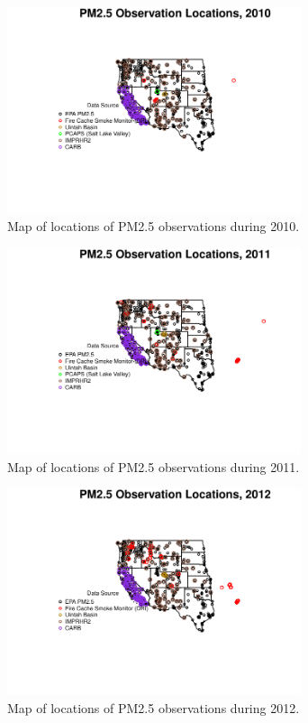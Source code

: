 \begin{figure} 
\centering 
\includegraphics[width=0.77\textwidth]{Code_Outputs/MapPM25_All_Sitesplot_year2010.pdf} 
\caption{\label{fig:MapPM25Loc2010}Map of locations of PM2.5 observations during 2010.} 
\end{figure} 
 

\begin{figure} 
\centering 
\includegraphics[width=0.77\textwidth]{Code_Outputs/MapPM25_All_Sitesplot_year2011.pdf} 
\caption{\label{fig:MapPM25Loc2011}Map of locations of PM2.5 observations during 2011.} 
\end{figure} 
 

\begin{figure} 
\centering 
\includegraphics[width=0.77\textwidth]{Code_Outputs/MapPM25_All_Sitesplot_year2012.pdf} 
\caption{\label{fig:MapPM25Loc2012}Map of locations of PM2.5 observations during 2012.} 
\end{figure} 
 

